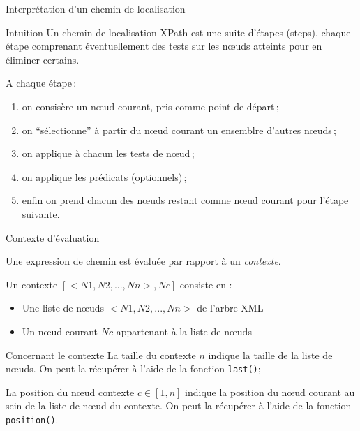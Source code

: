 \begin{frame}{Interprétation d'un chemin de localisation}

\begin{block}{Intuition}
Un chemin de localisation XPath est une suite d'étapes (steps), chaque étape comprenant éventuellement des tests 
sur les n{\oe}uds atteints pour en éliminer certains.
\end{block}

\medskip
A chaque étape\,:
\begin{enumerate}
  \item on consisère un \alert{n{\oe}ud courant}, pris comme point de départ\,;
   \item on ``sélectionne'' à partir du n{\oe}ud courant un ensemblre d'autres n{\oe}uds\,;
   \item on applique à chacun les tests de n{\oe}ud\,;
   \item on applique les prédicats (optionnels)\,;
   \item enfin on prend chacun des n{\oe}uds restant comme n{\oe}ud courant pour l'étape suivante.
\end{enumerate}
\end{frame}


\begin{frame}{Contexte d'évaluation}

Une expression de chemin est évaluée par rapport à un \textit{contexte}.

\bigskip

Un contexte $[< N1,N2,...,Nn >,Nc]$ consiste en \cite{WDMD} :
\begin{itemize}
\item Une liste de n{\oe}uds $< N1,N2,...,Nn >$ de l'arbre XML
\item Un n{\oe}ud courant $Nc$ appartenant à la liste de n{\oe}uds
\end{itemize}

\medskip

\begin{block}{Concernant le contexte}
La taille du contexte $n$ indique la taille de la liste de n{\oe}uds. On peut la récupérer à l'aide de la fonction \verb?last()?;

\medskip

La position du n{\oe}ud contexte $c \in [1, n]$ indique la position du n{\oe}ud courant au sein de la liste de n{\oe}ud du contexte.
On peut la récupérer à l'aide de la fonction \verb?position()?.
\end{block}


\end{frame}


